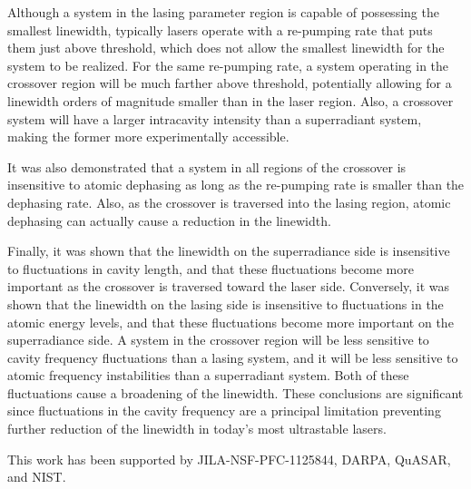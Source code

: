 \documentclass[aps,prl,twocolumn,
superscriptaddress,groupedaddress]{revtex4}
\begin{document}
Although a system in the lasing parameter region is capable of
possessing the smallest linewidth, typically lasers operate with a
re-pumping rate that puts them just above threshold, which does not
allow the smallest linewidth for the system to be realized. For the same
re-pumping rate, a system operating in the crossover region will be much
farther above threshold, potentially allowing for a linewidth orders of
magnitude smaller than in the laser region. Also, a crossover system
will have a larger intracavity intensity than a superradiant system,
making the former more experimentally accessible.

It was also demonstrated that a system in all regions of the crossover
is insensitive to atomic dephasing as long as the re-pumping rate is
smaller than the dephasing rate. Also, as the crossover is traversed
into the lasing region, atomic dephasing can actually cause a reduction
in the linewidth.

Finally, it was shown that the linewidth on the superradiance side is
insensitive to fluctuations in cavity length, and that these
fluctuations become more important as the crossover is traversed toward
the laser side. Conversely, it was shown that the linewidth on the
lasing side is insensitive to fluctuations in the atomic energy levels,
and that these fluctuations become more important on the superradiance
side. A system in the crossover region will be less sensitive to cavity
frequency fluctuations than a lasing system, and it will be less
sensitive to atomic frequency instabilities than a superradiant system.
Both of these fluctuations cause a broadening of the linewidth. These
conclusions are significant since fluctuations in the cavity frequency
are a principal limitation preventing further reduction of the linewidth
in today's most ultrastable lasers.

This work has been supported by JILA-NSF-PFC-1125844, DARPA, QuASAR, and
NIST.




\end{document}
